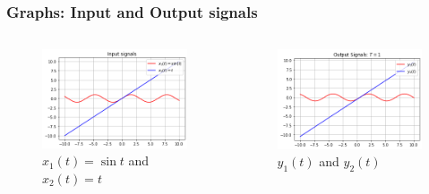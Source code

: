 \documentclass{beamer}
\begin{document}
\begin{frame}
  \frametitle{Graphs: Input and Output signals}
 \begin{columns}
\begin{column}{0.5\textwidth}
\begin{figure}
\begin{flushleft}
\includegraphics[width=\columnwidth]{graphs/input_signals.png}
 \caption{$x_1(t) = \sin{t}$ and $x_2(t) = t$}
\end{flushleft}
\end{figure}
\end{column}
\begin{column}{0.5\textwidth}
\begin{figure}
\begin{flushleft}
\includegraphics[width=\columnwidth]{graphs/output_signals.png}
 \caption{$y_1(t)$ and  $y_2(t)$}
\end{flushleft}
\end{figure}
\end{column}
\end{columns}
\end{frame}
\end{document}

